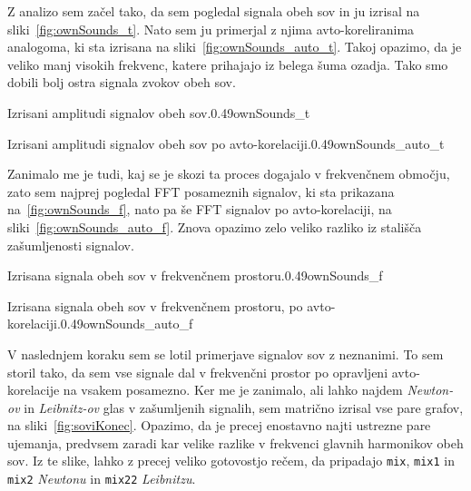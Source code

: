 \documentclass{porocilo}
\begin{document}
Z analizo sem začel tako, da sem pogledal signala obeh sov in ju izrisal na sliki~\ref{fig:ownSounds_t}. Nato sem ju primerjal z njima avto-koreliranima analogoma, ki sta izrisana na sliki~\ref{fig:ownSounds_auto_t}. Takoj opazimo, da je veliko manj visokih frekvenc, katere prihajajo iz belega šuma ozadja. Tako smo dobili bolj ostra signala zvokov obeh sov.

\begin{multifig}{2}{Izrisani amplitudi signalov obeh sov.}{0.49}{ownSounds_t}
\end{multifig}

\begin{multifig}{2}{Izrisani amplitudi signalov obeh sov po avto-korelaciji.}{0.49}{ownSounds_auto_t}
\end{multifig}

Zanimalo me je tudi, kaj se je skozi ta proces dogajalo v frekvenčnem območju, zato sem najprej pogledal FFT posameznih signalov, ki sta prikazana na~\ref{fig:ownSounds_f}, nato pa še FFT signalov po avto-korelaciji, na sliki~\ref{fig:ownSounds_auto_f}. Znova opazimo zelo veliko razliko iz stališča zašumljenosti signalov.

\begin{multifig}{2}{Izrisana signala obeh sov v frekvenčnem prostoru.}{0.49}{ownSounds_f}
\end{multifig}

\begin{multifig}{2}{Izrisana signala obeh sov v frekvenčnem prostoru, po avto-korelaciji.}{0.49}{ownSounds_auto_f}
\end{multifig}

V naslednjem koraku sem se lotil primerjave signalov sov z neznanimi. To sem storil tako, da sem vse signale dal v frekvenčni prostor po opravljeni avto-korelacije na vsakem posamezno. Ker me je zanimalo, ali lahko najdem \textit{Newton-ov} in \textit{Leibnitz-ov} glas v zašumljenih signalih, sem matrično izrisal vse pare grafov, na sliki~\ref{fig:soviKonec}. Opazimo, da je precej enostavno najti ustrezne pare ujemanja, predvsem zaradi kar velike razlike v frekvenci glavnih harmonikov obeh sov. Iz te slike, lahko z precej veliko gotovostjo rečem, da pripadajo {\tt mix}, {\tt mix1} in {\tt mix2} \textit{Newtonu} in {\tt mix22} \textit{Leibnitzu}.
\end{document}
